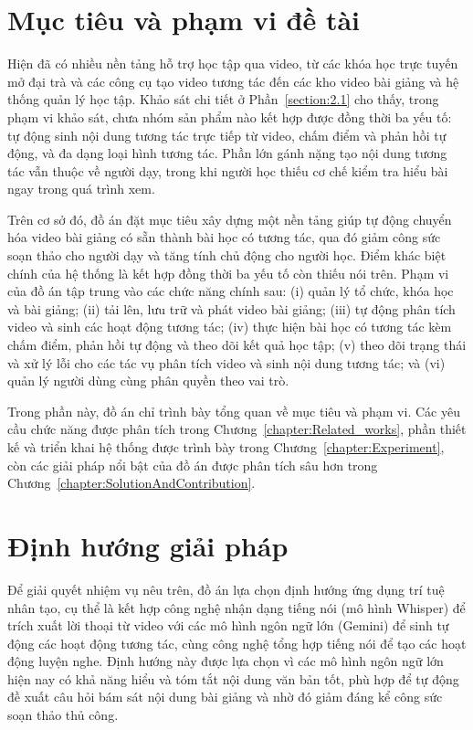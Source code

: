\documentclass[../DoAn.tex]{subfiles}
\begin{document}
\section{Mục tiêu và phạm vi đề tài}
\label{section:1.2}
Hiện đã có nhiều nền tảng hỗ trợ học tập qua video, từ các khóa học trực tuyến mở đại trà và các công cụ tạo video tương tác đến các kho video bài giảng và hệ thống quản lý học tập. Khảo sát chi tiết ở Phần~\ref{section:2.1} cho thấy, trong phạm vi khảo sát, chưa nhóm sản phẩm nào kết hợp được đồng thời ba yếu tố: tự động sinh nội dung tương tác trực tiếp từ video, chấm điểm và phản hồi tự động, và đa dạng loại hình tương tác. Phần lớn gánh nặng tạo nội dung tương tác vẫn thuộc về người dạy, trong khi người học thiếu cơ chế kiểm tra hiểu bài ngay trong quá trình xem.

Trên cơ sở đó, đồ án đặt mục tiêu xây dựng một nền tảng giúp tự động chuyển hóa video bài giảng có sẵn thành bài học có tương tác, qua đó giảm công sức soạn thảo cho người dạy và tăng tính chủ động cho người học. Điểm khác biệt chính của hệ thống là kết hợp đồng thời ba yếu tố còn thiếu nói trên. Phạm vi của đồ án tập trung vào các chức năng chính sau: (i) quản lý tổ chức, khóa học và bài giảng; (ii) tải lên, lưu trữ và phát video bài giảng; (iii) tự động phân tích video và sinh các hoạt động tương tác; (iv) thực hiện bài học có tương tác kèm chấm điểm, phản hồi tự động và theo dõi kết quả học tập; (v) theo dõi trạng thái và xử lý lỗi cho các tác vụ phân tích video và sinh nội dung tương tác; và (vi) quản lý người dùng cùng phân quyền theo vai trò.

Trong phần này, đồ án chỉ trình bày tổng quan về mục tiêu và phạm vi. Các yêu cầu chức năng được phân tích trong Chương~\ref{chapter:Related_works}, phần thiết kế và triển khai hệ thống được trình bày trong Chương~\ref{chapter:Experiment}, còn các giải pháp nổi bật của đồ án được phân tích sâu hơn trong Chương~\ref{chapter:SolutionAndContribution}.

\section{Định hướng giải pháp}
\label{section:1.3}
Để giải quyết nhiệm vụ nêu trên, đồ án lựa chọn định hướng ứng dụng trí tuệ nhân tạo, cụ thể là kết hợp công nghệ nhận dạng tiếng nói (mô hình Whisper) để trích xuất lời thoại từ video với các mô hình ngôn ngữ lớn (Gemini) để sinh tự động các hoạt động tương tác, cùng công nghệ tổng hợp tiếng nói để tạo các hoạt động luyện nghe. Định hướng này được lựa chọn vì các mô hình ngôn ngữ lớn hiện nay có khả năng hiểu và tóm tắt nội dung văn bản tốt, phù hợp để tự động đề xuất câu hỏi bám sát nội dung bài giảng và nhờ đó giảm đáng kể công sức soạn thảo thủ công.
\end{document}

